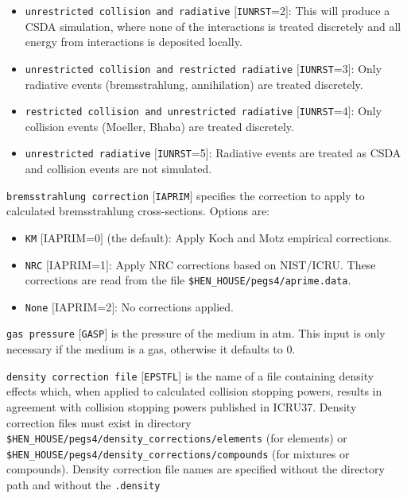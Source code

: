 \begin{description}
\begin{description}
\begin{itemize}
\item {\tt unrestricted collision and radiative} $[${\tt IUNRST}=2$]$: This will produce a CSDA simulation, where none of the
interactions is treated discretely and all energy from interactions is deposited locally.
\item {\tt unrestricted collision and restricted radiative} $[${\tt IUNRST}=3$]$: Only radiative events (bremsstrahlung, annihilation)
are treated discretely.
\item {\tt restricted collision and unrestricted radiative} $[${\tt IUNRST}=4$]$: Only collision events (Moeller, Bhaba) are
treated discretely.
\item {\tt unrestricted radiative} $[${\tt IUNRST}=5$]$: Radiative events are treated as CSDA and collision events are not simulated.
\end{itemize}
\item {\tt bremsstrahlung correction} $[${\tt IAPRIM}$]$ specifies the correction to apply to calculated bremsstrahlung cross-sections.
Options are:
\begin{itemize}
\item {\tt KM} $[$IAPRIM=0$]$ (the default): Apply Koch and Motz\cite{KM59} empirical corrections.
\item {\tt NRC} $[$IAPRIM=1$]$: Apply NRC corrections based on NIST/ICRU\cite{Ro89a}.  These corrections are read from the file
{\tt \$HEN\_HOUSE/pegs4/aprime.data}.
\item {\tt None} $[$IAPRIM=2$]$: No corrections applied.
\end{itemize}
\item {\tt gas pressure} $[${\tt GASP}$]$ is the pressure of the medium in atm.  This input is only necessary if the medium is a gas, otherwise it
defaults to 0.
\item {\tt density correction file} $[${\tt EPSTFL}$]$ is the name of a file containing density effects which, when applied to calculated collision
stopping powers, results in agreement with collision stopping powers published in ICRU37\cite{ICRU37}.  Density correction files must exist
in directory {\tt \$HEN\_HOUSE/pegs4/density\_corrections/elements} (for elements) or {\tt \$HEN\_HOUSE/pegs4/density\_corrections/compounds} (for mixtures or compounds).  Density correction file names are specified without the directory path and without the {\tt .density}

\end{description}
\end{description}
